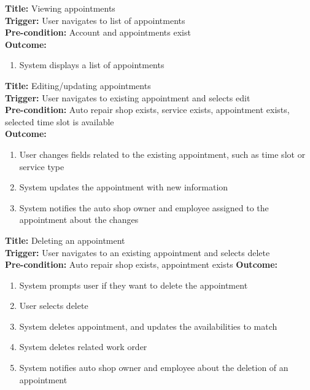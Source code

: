 \documentclass[12pt]{article}
\begin{document}
\textbf{Title:} Viewing appointments\\
\textbf{Trigger:} User navigates to list of appointments\\
\textbf{Pre-condition:} Account and appointments exist\\
\textbf{Outcome:}
\begin{enumerate}
	\item System displays a list of appointments
\end{enumerate}

\textbf{Title:} Editing/updating appointments\\
\textbf{Trigger:} User navigates to existing appointment and selects edit\\
\textbf{Pre-condition:} Auto repair shop exists, service exists, appointment exists, selected time slot is available\\
\textbf{Outcome:}
\begin{enumerate}
	\item User changes fields related to the existing appointment, such as time slot or service type
	\item System updates the appointment with new information
	\item System notifies the auto shop owner and employee assigned to the appointment about the changes
\end{enumerate}

\textbf{Title:} Deleting an appointment\\
\textbf{Trigger:} User navigates to an existing appointment and selects delete\\
\textbf{Pre-condition:} Auto repair shop exists, appointment exists
\textbf{Outcome:}
\begin{enumerate}
	\item System prompts user if they want to delete the appointment
	\item User selects delete
	\item System deletes appointment, and updates the availabilities to match
	\item System deletes related work order
	\item System notifies auto shop owner and employee about the deletion of an appointment
\end{enumerate}
\end{document}
